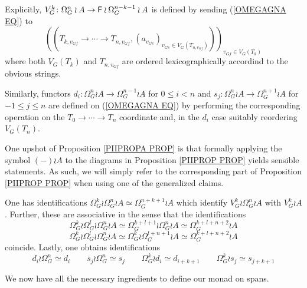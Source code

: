 \documentclass[a4paper,10pt]{article}%
\begin{document}
\begin{remark}\label{VGDEFA REM}
Explicitly,
$V_G^{k} \colon \Omega_{G}^{n} \wr A
\to \mathsf{F} \wr \Omega_{G}^{n-k-1} \wr A $
is defined by sending (\ref{OMEGAGNA EQ}) to
\begin{equation}\label{VGDEFA EQ}
	\left(
		\left(
		T_{k,v_{G f}} \to \cdots \to T_{n,v_{G f}},
		\left(
		a_{v_{G e}}
		\right)_{v_{G e} \in V_G\left(T_{n,v_{G f}}\right)}
		\right)
	\right)_{v_{G f} \in V_G(T_k)}
\end{equation}
where both $V_G(T_k)$ and $T_{n,v_{G f}}$ are ordered lexicographically accordind to the obvious strings.

Similarly, functors 
$d_i \colon \Omega_{G}^{n} \wr A \to \Omega_{G}^{n-1} \wr A$
for $0 \leq i < n$
and 
$s_j \colon \Omega_{G}^{n} \wr A \to \Omega_{G}^{n+1} \wr A$
for $-1 \leq j \leq n$
are defined on (\ref{OMEGAGNA EQ})
by performing the corresponding operation on the $T_0 \to \cdots \to T_n$ coordinate and, in the $d_i$ case suitably reordering
$V_G(T_n)$.
\end{remark}

\begin{remark}
One upshot of Proposition \ref{PIIPROPA PROP} is that formally applying the symbol $(\minus) \wr A$ 
to the diagrams in Proposition \ref{PIIPROP PROP} yields sensible statements. As such, we will simply refer to the corresponding part of
Proposition \ref{PIIPROP PROP} when
using one of the generalized claims.
\end{remark}

\begin{corollary}
One has identifications 
$\Omega_G^k \wr \Omega_G^n \wr A \simeq \Omega_{G}^{n+k+1} \wr A$ which identify $V_G^k \wr \Omega_G^n \wr A$ with 
$V_G^k \wr A$.
Further, these are associative in the sense that the identifications
\[
	\Omega_G^k \wr \Omega_G^l \wr \Omega_G^n \wr A \simeq 
	\Omega_G^{k+l+1} \wr \Omega_G^n \wr A \simeq 
	\Omega_G^{k+l+n+2} \wr A 
\]
\[
	\Omega_G^k \wr \Omega_G^l \wr \Omega_G^n \wr A \simeq 
	\Omega_G^{k} \wr \Omega_G^{l+n+1} \wr A \simeq 
	\Omega_G^{k+l+n+2} \wr A 
\]
coincide.
Lastly, one obtains identifications
\[
	d_i \wr \Omega_G^n \simeq d_i \qquad
	s_j \wr \Omega_G^n \simeq s_j \qquad
	\Omega_G^k \wr d_i \simeq d_{i+k+1} \qquad
	\Omega_G^k \wr s_j \simeq s_{j+k+1}
\]
\end{corollary}

We now have all the necessary ingredients to define our monad on 
spans.
\end{document}
